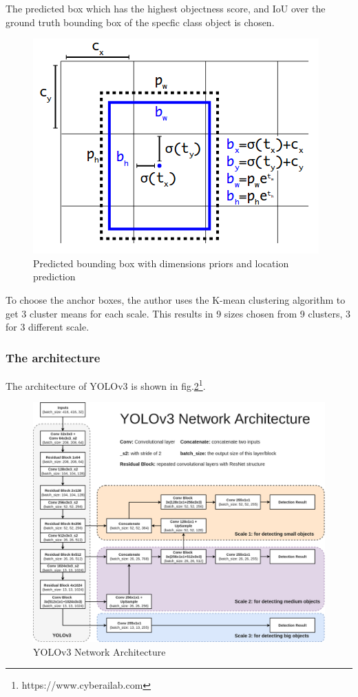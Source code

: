 The predicted box which has the highest objectness score, and \acrshort{IoU} over the ground truth bounding box of the specfic class object is chosen.
\begin{figure}[h!]
    \centering
    \includegraphics[scale=0.6]{Chapters/Fig/yolo_bounding_box.png}
    \caption{Predicted bounding box with dimensions priors and location prediction}
    \label{fig:bounding_box}
\end{figure}
\par
To choose the anchor boxes, the author uses the K-mean clustering algorithm to get 3 cluster means for each scale\cite{yolov3}. This results in 9 sizes chosen from 9 clusters, 3 for 3 different scale.
\subsubsection{The architecture}
\hspace{0.45cm}The architecture of YOLOv3 \cite{yolov3} is shown in fig.\ref{fig:yolo_arc}\footnote{https://www.cyberailab.com}.\par 
\begin{figure}[h!]
    \centering
    \includegraphics[scale=0.3]{Chapters/Fig/YOLOv3_architecture.png}
    \caption{YOLOv3 Network Architecture}
    \label{fig:yolo_arc}
\end{figure}

